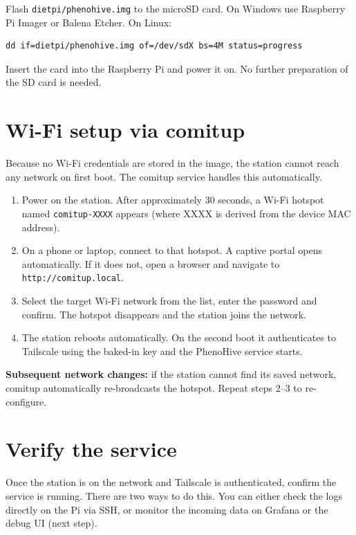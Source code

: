Flash \texttt{dietpi/phenohive.img} to the microSD card. On Windows use Raspberry Pi Imager or Balena Etcher. On Linux:
\begin{verbatim}
dd if=dietpi/phenohive.img of=/dev/sdX bs=4M status=progress
\end{verbatim}

Insert the card into the Raspberry Pi and power it on. No further preparation of the SD card is needed.

\section{Wi-Fi setup via comitup}

Because no Wi-Fi credentials are stored in the image, the station cannot reach any network on first boot. The comitup service handles this automatically.

\begin{enumerate}
    \item Power on the station. After approximately 30 seconds, a Wi-Fi hotspot named \texttt{comitup-XXXX} appears (where XXXX is derived from the device MAC address).
    \item On a phone or laptop, connect to that hotspot. A captive portal opens automatically. If it does not, open a browser and navigate to \texttt{http://comitup.local}.
    \item Select the target Wi-Fi network from the list, enter the password and confirm. The hotspot disappears and the station joins the network.
    \item The station reboots automatically. On the second boot it authenticates to Tailscale using the baked-in key and the PhenoHive service starts.
\end{enumerate}

\textbf{Subsequent network changes:} if the station cannot find its saved network, comitup automatically re-broadcasts the hotspot. Repeat steps 2--3 to re-configure.

\section{Verify the service}

Once the station is on the network and Tailscale is authenticated, confirm the service is running. 
There are two ways to do this. You can either check the logs directly on the Pi via SSH, or monitor the incoming data on Grafana or the debug UI (next step).

